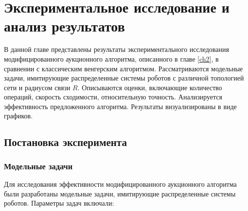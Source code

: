 \chapter{Экспериментальное исследование и анализ результатов}
\label{ch4}

\vspace{0.5cm}

В данной главе представлены результаты экспериментального исследования модифицированного аукционного алгоритма, описанного в главе \ref{ch2}, в сравнении с классическим венгерским алгоритмом. Рассматриваются модельные задачи, имитирующие распределенные системы роботов с различной топологией сети и радиусом связи \( R \). Описываются оценки, включающие количество операций, скорость сходимости, относительную точность. Анализируется эффективность предложенного алгоритма. Результаты визуализированы в виде графиков.

\section{Постановка эксперимента}

\subsection{Модельные задачи}

\vspace{0.3cm}

Для исследования эффективности модифицированного аукционного алгоритма были разработаны модельные задачи, имитирующие распределенные системы роботов. Параметры задач включали:

